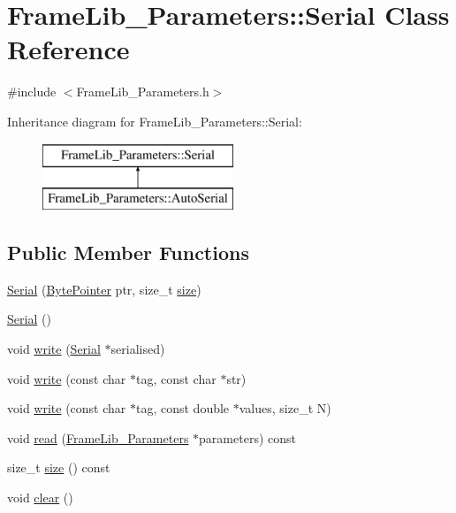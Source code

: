 \hypertarget{class_frame_lib___parameters_1_1_serial}{}\section{Frame\+Lib\+\_\+\+Parameters\+:\+:Serial Class Reference}
\label{class_frame_lib___parameters_1_1_serial}


{\ttfamily \#include $<$Frame\+Lib\+\_\+\+Parameters.\+h$>$}

Inheritance diagram for Frame\+Lib\+\_\+\+Parameters\+:\+:Serial\+:\begin{figure}[H]
\begin{center}
\leavevmode
\includegraphics[height=2.000000cm]{class_frame_lib___parameters_1_1_serial}
\end{center}
\end{figure}
\subsection*{Public Member Functions}
\begin{DoxyCompactItemize}
\item 
\hyperlink{class_frame_lib___parameters_1_1_serial_a240eb02a38ab2e545c088f63df9f1851}{Serial} (\hyperlink{_frame_lib___types_8h_a2c5689a997a12479b7d925e565428141}{Byte\+Pointer} ptr, size\+\_\+t \hyperlink{class_frame_lib___parameters_1_1_serial_a04ad46904d9fd8119283eae663901886}{size})
\item 
\hyperlink{class_frame_lib___parameters_1_1_serial_af433868e4f3db5ef6581e3aae7b430a6}{Serial} ()
\item 
void \hyperlink{class_frame_lib___parameters_1_1_serial_ac06dc6d9539d62ec2a292263e6322e62}{write} (\hyperlink{class_frame_lib___parameters_1_1_serial}{Serial} $\ast$serialised)
\item 
void \hyperlink{class_frame_lib___parameters_1_1_serial_ac28ddf8524a2f0124ed8b6585a59fe10}{write} (const char $\ast$tag, const char $\ast$str)
\item 
void \hyperlink{class_frame_lib___parameters_1_1_serial_a27af79a7ed1e500511e36731ec10b910}{write} (const char $\ast$tag, const double $\ast$values, size\+\_\+t N)
\item 
void \hyperlink{class_frame_lib___parameters_1_1_serial_a16178b2e34449dc5f63d5d2f16ba17d5}{read} (\hyperlink{class_frame_lib___parameters}{Frame\+Lib\+\_\+\+Parameters} $\ast$parameters) const
\item 
size\+\_\+t \hyperlink{class_frame_lib___parameters_1_1_serial_a04ad46904d9fd8119283eae663901886}{size} () const
\item 
void \hyperlink{class_frame_lib___parameters_1_1_serial_a5c5fdd1e22ef366407e77b09554df8f8}{clear} ()
\end{DoxyCompactItemize}
